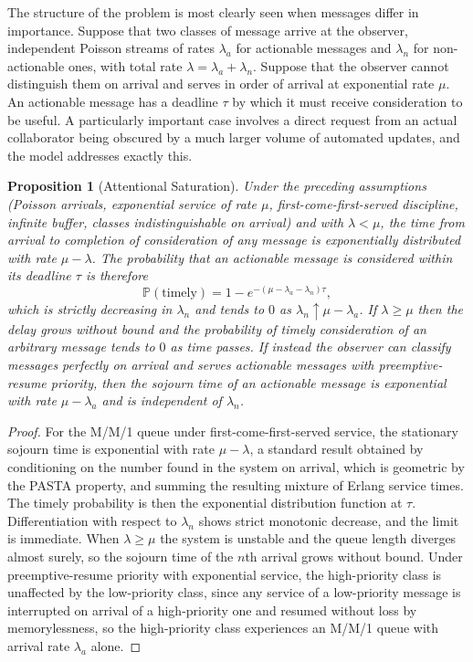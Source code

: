 \documentclass[11pt]{report}
\newtheorem{proposition}[theorem]{Proposition}
\theoremstyle{definition}
\theoremstyle{remark}
\newcommand{\PP}{\mathbb{P}}
\begin{document}
The structure of the problem is most clearly seen when messages differ in importance. Suppose that two classes of message arrive at the observer, independent Poisson streams of rates $\lambda_a$ for actionable messages and $\lambda_n$ for non-actionable ones, with total rate $\lambda=\lambda_a+\lambda_n$. Suppose that the observer cannot distinguish them on arrival and serves in order of arrival at exponential rate $\mu$. An actionable message has a deadline $\tau$ by which it must receive consideration to be useful. A particularly important case involves a direct request from an actual collaborator being obscured by a much larger volume of automated updates, and the model addresses exactly this.

\begin{proposition}[Attentional Saturation]\label{prop:saturation}
Under the preceding assumptions (Poisson arrivals, exponential service of rate $\mu$, first-come-first-served discipline, infinite buffer, classes indistinguishable on arrival) and with $\lambda<\mu$, the time from arrival to completion of consideration of any message is exponentially distributed with rate $\mu-\lambda$. The probability that an actionable message is considered within its deadline $\tau$ is therefore
\[
\PP(\text{timely})=1-e^{-(\mu-\lambda_a-\lambda_n)\tau},
\]
which is strictly decreasing in $\lambda_n$ and tends to $0$ as $\lambda_n\uparrow\mu-\lambda_a$. If $\lambda\ge\mu$ then the delay grows without bound and the probability of timely consideration of an arbitrary message tends to $0$ as time passes. If instead the observer can classify messages perfectly on arrival and serves actionable messages with preemptive-resume priority, then the sojourn time of an actionable message is exponential with rate $\mu-\lambda_a$ and is independent of $\lambda_n$.
\end{proposition}

\begin{proof}
For the M/M/1 queue under first-come-first-served service, the stationary sojourn time is exponential with rate $\mu-\lambda$, a standard result obtained by conditioning on the number found in the system on arrival, which is geometric by the PASTA property, and summing the resulting mixture of Erlang service times. The timely probability is then the exponential distribution function at $\tau$. Differentiation with respect to $\lambda_n$ shows strict monotonic decrease, and the limit is immediate. When $\lambda\ge\mu$ the system is unstable and the queue length diverges almost surely, so the sojourn time of the $n$th arrival grows without bound. Under preemptive-resume priority with exponential service, the high-priority class is unaffected by the low-priority class, since any service of a low-priority message is interrupted on arrival of a high-priority one and resumed without loss by memorylessness, so the high-priority class experiences an M/M/1 queue with arrival rate $\lambda_a$ alone.
\end{proof}
\end{document}
